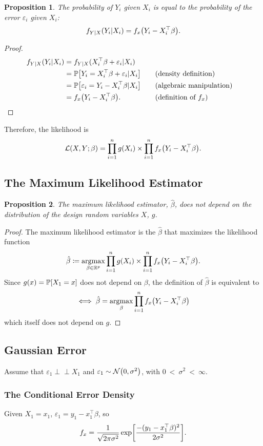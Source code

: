 \documentclass[letterpaper, reqno]{amsart}
\newtheorem{prop}{Proposition}[section]
\numberwithin{equation}{section}
\newcommand{\T}{\top} %
\newcommand{\Prob}[1]{\mathbb{P}\mleft[#1\mright]}
\newcommand{\Li}[1]{\mathcal{L}\mleft( #1 \mright)}  %
\newcommand{\R}{\mathbb{R}}  %
\newcommand{\N}[2]{\mathcal{N}\mleft( #1, #2 \mright)}
\newcommand{\indep}{\perp \!\!\! \perp}  %
\newcommand{\by}[1]{&\quad&\text{(#1)}}
\newcommand{\Bv}{\beta}
\newcommand{\Bvh}{\hat{\beta}}
\newcommand{\ve}{\varepsilon}
\DeclareMathOperator*{\argmax}{argmax}
\begin{document}
\begin{prop}
  The probability of $Y_i$ given $X_i$ is equal to the probability of the error
  $\ve_i$ given $X_i$:
  \[ f_{Y|X}(Y_i | X_i) = f_x\mleft(Y_i - X_i^\T\Bv\mright). \]
\end{prop}

\begin{proof}
  \begin{alignat*}{3}
    f_{Y|X}(Y_i | X_i) &= f_{Y|X}(X_i^\T \Bv + \ve_i | X_i) \\
    &= \Prob{Y_i = X_i^\T \Bv + \ve_i | X_i} \by{density definition} \\
    &= \Prob{\ve_i = Y_i - X_i^\T\Bv | X_i} \by{algebraic manipulation} \\
    &= f_x\mleft(Y_i - X_i^\T\Bv\mright). \by{definition of $f_x$} \tag*{\qedhere}
  \end{alignat*}
\end{proof}

Therefore, the likelihood is
  \[ \Li{X, Y; \Bv} = \prod_{i=1}^n g(X_i) \times \prod_{i=1}^n f_x\mleft(Y_i - X_i^\T\Bv\mright). \]

\subsection{The Maximum Likelihood Estimator}
\begin{prop}
  The maximum likelihood estimator, $\Bvh$, does not depend on the distribution
  of the design random variables $X$, $g$.
\end{prop}

\begin{proof}
  The maximum likelihood estimator is the $\Bvh$ that maximizes the likelihood
  function
  \[ \Bvh \coloneqq \argmax_{\Bv \in \R^p} \prod_{i=1}^n g(X_i) 
    \times \prod_{i=1}^n f_x\mleft(Y_i - X_i^\T\Bv\mright). \]
  Since $g(x) = \Prob{X_1 = x}$ does not depend on $\Bv$, the definition of
  $\Bvh$ is equivalent to
  \[ \iff \Bvh = \argmax_\Bv \prod_{i=1}^n f_x\mleft(Y_i - X_i^\T\Bv\mright) \]
  which itself does not depend on $g$.
\end{proof}

\subsection{Gaussian Error}
Assume that $\ve_1 \indep X_1$ and $\ve_1 \sim \N{0}{\sigma^2}$,
with $0~<~\sigma^2~<~\infty$.

\subsubsection{The Conditional Error Density}
Given $X_1 = x_1$, $\ve_1 = y_1 - x_1^\T\Bv$, so
\[ f_x = \frac{1}{\sqrt{2\pi\sigma^2}} \exp \mleft[\frac{-(y_1 - x_1^\T\Bv)^2}{2\sigma^2}\mright]. \]
\end{document}
